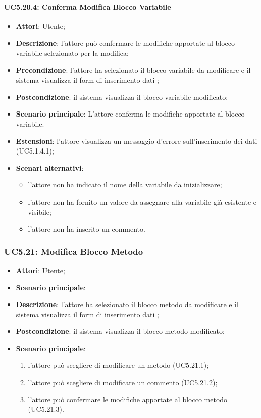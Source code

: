 \begin{itemize}
\begin{itemize}
\begin{itemize}
\begin{itemize}
\paragraph{UC5.20.4: Conferma Modifica Blocco Variabile}
\label{UC5.20.4}
\begin{itemize}
	\item \textbf{Attori}: Utente;
	\item \textbf{Descrizione}: l'attore può confermare le modifiche apportate al blocco variabile selezionato per la modifica;
	\item \textbf{Precondizione}: l'attore ha selezionato il blocco variabile da modificare e il sistema visualizza il form di inserimento dati ;
	\item \textbf{Postcondizione}: il sistema visualizza il blocco variabile modificato;
	\item \textbf{Scenario principale}: L'attore conferma le modifiche apportate al blocco variabile.
	\item \textbf{Estensioni}: l'attore visualizza un messaggio d'errore sull'inserimento dei dati (UC5.1.4.1);
	\item \textbf{Scenari alternativi}:
	\begin{itemize}
		\item l'attore non ha indicato il nome della variabile da inizializzare;
		\item l'attore non ha fornito un valore da assegnare alla variabile già esistente e visibile;
		\item l'attore non ha inserito un commento.
	\end{itemize}
\end{itemize}

\subsubsection{UC5.21: Modifica Blocco Metodo}
\label{UC5.21}
\begin{itemize}
	\item \textbf{Attori}: Utente;\item \textbf{Scenario principale}:

	\item \textbf{Descrizione}: l'attore ha selezionato il blocco metodo da modificare e il sistema visualizza il form di inserimento dati ;
	\item \textbf{Postcondizione}: il sistema visualizza il blocco metodo modificato;
	\item \textbf{Scenario principale}:
	\begin{enumerate}
		\item l'attore può scegliere di modificare un metodo (UC5.21.1);
		\item l'attore può scegliere di modificare un commento (UC5.21.2);
		\item l'attore può confermare le modifiche apportate al blocco metodo (UC5.21.3).
	\end{enumerate}
\end{itemize}


\end{itemize}
\end{itemize}
\end{itemize}
\end{itemize}
